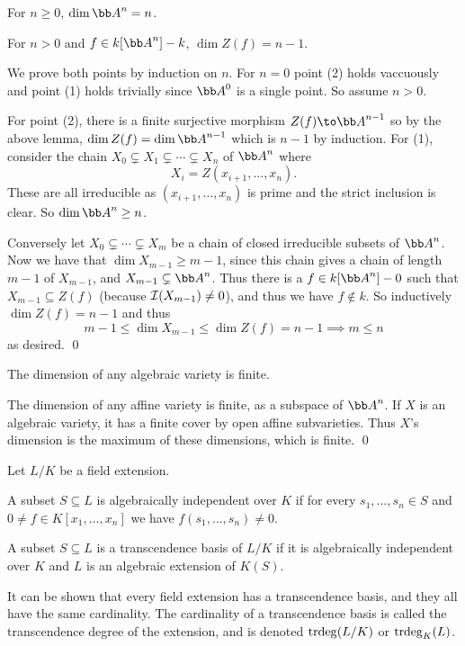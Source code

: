 \enote

\bthrm

    \benum
        \item For $n\geq0$, $\dim\bA^n=n$.
        \item For $n>0$ and $f\in k[\bA^n]-k$, $\dim Z(f)=n-1$.
    \eenum

\ethrm

\bproof

    We prove both points by induction on $n$.
    For $n=0$ point (2) holds vaccuously and point (1) holds trivially since $\bA^0$ is a single point.
    So assume $n>0$.

    For point (2), there is a finite surjective morphism $Z(f)\to\bA^{n-1}$ so by the above lemma, $\dim Z(f)=\dim\bA^{n-1}$ which is $n-1$ by induction.
    For (1), consider the chain $X_0\subsetneq X_1\subsetneq\cdots\subsetneq X_n$ of $\bA^n$ where
    $$ X_i = Z(x_{i+1},\dots,x_n) . $$
    These are all irreducible as $(x_{i+1},\dots,x_n)$ is prime and the strict inclusion is clear.
    So $\dim\bA^n\geq n$.

    Conversely let $X_0\subsetneq\cdots\subsetneq X_m$ be a chain of closed irreducible subsets of $\bA^n$.
    Now we have that $\dim X_{m-1}\geq m-1$, since this chain gives a chain of length $m-1$ of $X_{m-1}$, and $X_{m-1}\subsetneq\bA^n$.
    Thus there is a $f\in k[\bA^n]-0$ such that $X_{m-1}\subseteq Z(f)$ (because ${{\cal I}}(X_{m-1})\neq0$), and thus we have $f\notin k$.
    So inductively $\dim Z(f)=n-1$ and thus
    $$ m - 1 \leq \dim X_{m-1} \leq \dim Z(f) = n - 1 \implies m\leq n $$
    as desired.
    \qed

\eproof

\bcoro

    The dimension of any algebraic variety is finite.

\ecoro

\bproof

    The dimension of any affine variety is finite, as a subspace of $\bA^n$.
    If $X$ is an algebraic variety, it has a finite cover by open affine subvarieties.
    Thus $X$'s dimension is the maximum of these dimensions, which is finite.
    \qed

\eproof

\bdefn

    Let $L/K$ be a field extension.
    \benum
        \item A subset $S\subseteq L$ is {\emphcolor algebraically independent} over $K$ if for every $s_1,\dots,s_n\in S$ and $0\neq f\in K[x_1,\dots,x_n]$
        we have $f(s_1,\dots,s_n)\neq0$.
        \item A subset $S\subseteq L$ is a {\emphcolor transcendence basis} of $L/K$ if it is algebraically independent over $K$ and $L$ is an algebraic extension
        of $K(S)$.
        \item It can be shown that every field extension has a transcendence basis, and they all have the same cardinality.
        The cardinality of a transcendence basis is called the {\emphcolor transcendence degree} of the extension, and is denoted ${\mathop{\rm trdeg}}(L/K)$ or ${\mathop{\rm trdeg}}_K(L)$.
    \eenum

